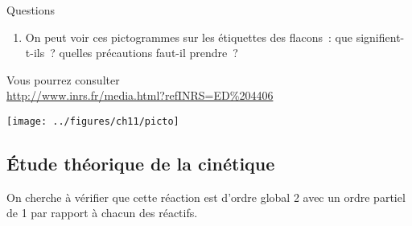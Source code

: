 \documentclass[a4paper, 11pt, final, garamond]{book}
\begin{document}
\vspace{-10pt}
\begin{rexem}{Questions}
    \begin{minipage}{0.55\linewidth}
        \begin{enumerate}[label=\sqenumi, start=3]
            \item On peut voir ces pictogrammes sur les étiquettes des flacons~: que
                signifient-t-ils~? quelles précautions faut-il prendre~?
        \end{enumerate}
        Vous pourrez consulter\\
        \url{http://www.inrs.fr/media.html?refINRS=ED%204406}
    \end{minipage}
    \hfill
    \begin{minipage}{0.40\linewidth}
        \begin{center}
            \texttt{[image: ../figures/ch11/picto]}
        \end{center} 
    \end{minipage}
\end{rexem}

\subsection{\'Etude théorique de la cinétique}

On cherche à vérifier que cette réaction est d'ordre global 2 avec un ordre
partiel de 1 par rapport à chacun des réactifs.
\end{document}
